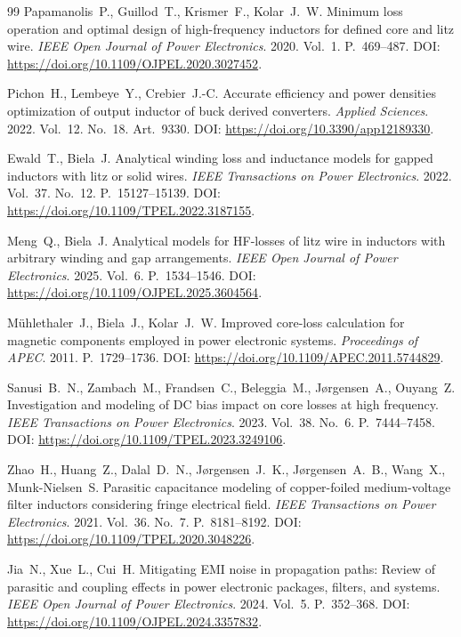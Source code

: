 \documentclass[14pt,a4paper]{extarticle}
\begin{document}
\begin{thebibliography}{99}
Papamanolis~P., Guillod~T., Krismer~F., Kolar~J.~W.
Minimum loss operation and optimal design of high-frequency inductors for
defined core and litz wire.
\textit{IEEE Open Journal of Power Electronics}. 2020. Vol.~1.
P.~469--487.
DOI: \url{https://doi.org/10.1109/OJPEL.2020.3027452}.

Pichon~H., Lembeye~Y., Crebier~J.-C.
Accurate efficiency and power densities optimization of output inductor of
buck derived converters.
\textit{Applied Sciences}. 2022. Vol.~12. No.~18. Art.~9330.
DOI: \url{https://doi.org/10.3390/app12189330}.

Ewald~T., Biela~J.
Analytical winding loss and inductance models for gapped inductors with
litz or solid wires.
\textit{IEEE Transactions on Power Electronics}. 2022. Vol.~37. No.~12.
P.~15127--15139.
DOI: \url{https://doi.org/10.1109/TPEL.2022.3187155}.

Meng~Q., Biela~J.
Analytical models for HF-losses of litz wire in inductors with arbitrary
winding and gap arrangements.
\textit{IEEE Open Journal of Power Electronics}. 2025. Vol.~6.
P.~1534--1546.
DOI: \url{https://doi.org/10.1109/OJPEL.2025.3604564}.

Mühlethaler~J., Biela~J., Kolar~J.~W.
Improved core-loss calculation for magnetic components employed in power
electronic systems.
\textit{Proceedings of APEC}. 2011. P.~1729--1736.
DOI: \url{https://doi.org/10.1109/APEC.2011.5744829}.

Sanusi~B.~N., Zambach~M., Frandsen~C., Beleggia~M.,
J\o{}rgensen~A., Ouyang~Z.
Investigation and modeling of DC bias impact on core losses at high
frequency.
\textit{IEEE Transactions on Power Electronics}. 2023. Vol.~38. No.~6.
P.~7444--7458.
DOI: \url{https://doi.org/10.1109/TPEL.2023.3249106}.

Zhao~H., Huang~Z., Dalal~D.~N., J\o{}rgensen~J.~K.,
J\o{}rgensen~A.~B., Wang~X., Munk-Nielsen~S.
Parasitic capacitance modeling of copper-foiled medium-voltage filter
inductors considering fringe electrical field.
\textit{IEEE Transactions on Power Electronics}. 2021. Vol.~36. No.~7.
P.~8181--8192.
DOI: \url{https://doi.org/10.1109/TPEL.2020.3048226}.

Jia~N., Xue~L., Cui~H.
Mitigating EMI noise in propagation paths: Review of parasitic and coupling
effects in power electronic packages, filters, and systems.
\textit{IEEE Open Journal of Power Electronics}. 2024. Vol.~5.
P.~352--368.
DOI: \url{https://doi.org/10.1109/OJPEL.2024.3357832}.


\end{thebibliography}
\end{document}
